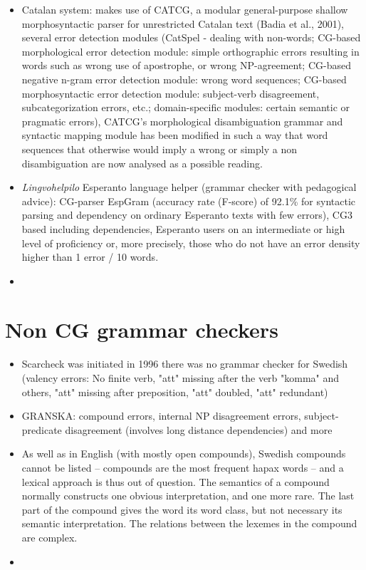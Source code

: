 \documentclass[a4paper,english,12pt]{article}
\begin{document}
\begin{spacing}{1.0}
\begin{itemize}
\item Catalan system: makes use of CATCG, a modular general-purpose shallow morphosyntactic parser for unrestricted Catalan text (Badia et al., 2001), several error detection modules (CatSpel - dealing with non-words; CG-based morphological error detection module: simple orthographic errors resulting in words such as wrong use of apostrophe, or wrong NP-agreement; CG-based negative n-gram error detection module: wrong word sequences; CG-based morphosyntactic error detection module: subject-verb disagreement, subcategorization errors, etc.; domain-specific modules: certain semantic or pragmatic errors), CATCG’s morphological disambiguation grammar and syntactic mapping module has been modified in such a way that word sequences that otherwise would imply a wrong or simply a non disambiguation are now analysed as a possible reading.
\item \textit{Lingvohelpilo} Esperanto language helper (grammar checker with pedagogical advice): CG-parser EspGram (accuracy rate (F-score) of 92.1\% for syntactic parsing and dependency on ordinary Esperanto texts with few errors), CG3 based including dependencies, Esperanto users on an intermediate or high level of proficiency or, more precisely, those who do not have an error density higher than 1 error / 10 words.
\item
\end{itemize}

\section{Non CG grammar checkers}

\begin{itemize}
\item Scarcheck was initiated in 1996 there was no grammar checker for Swedish (valency errors: No finite verb, "att" missing after the verb "komma" and others, "att" missing after preposition, "att" doubled, "att" redundant)
\item \cite{Carlberger2004} GRANSKA: compound errors, internal NP disagreement errors, subject-predicate disagreement (involves long distance dependencies) and more
\item As well as in English (with mostly open compounds), Swedish compounds cannot
be listed – compounds are the most frequent hapax words – and a lexical approach
is thus out of question. The semantics of a compound normally constructs one
obvious interpretation, and one more rare. The last part of the compound gives the
word its word class, but not necessary its semantic interpretation. The relations
between the lexemes in the compound are complex.
\item
\end{itemize}


\end{spacing}
\end{document}
